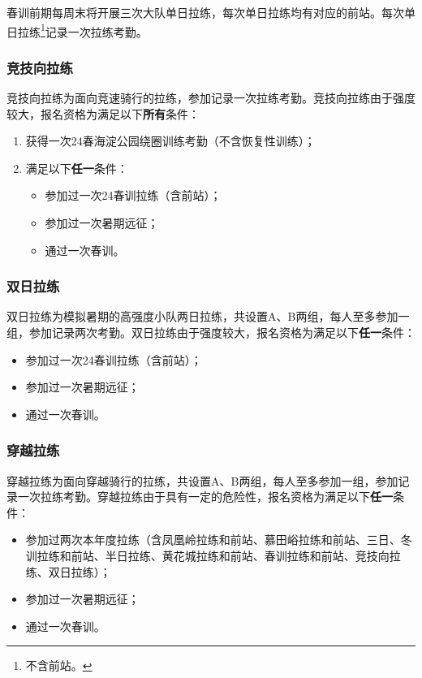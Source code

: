 \documentclass[UTF8]{ctexart}
\begin{document}
春训前期每周末将开展三次大队单日拉练，每次单日拉练均有对应的前站。每次单日拉练\footnote{不含前站。}记录一次拉练考勤。

\subsubsection{竞技向拉练}

竞技向拉练为面向竞速骑行的拉练，参加记录一次拉练考勤。竞技向拉练由于强度较大，报名资格为满足以下\textbf{所有}条件：
\begin{enumerate}[nosep,left=4em]
    \item 获得一次24春海淀公园绕圈训练考勤（不含恢复性训练）；
    \item 满足以下\textbf{任一}条件：
    \begin{itemize}[nosep,left=1em]
        \item 参加过一次24春训拉练（含前站）；
        \item 参加过一次暑期远征；
        \item 通过一次春训。
    \end{itemize}
\end{enumerate}

\subsubsection{双日拉练}

双日拉练为模拟暑期的高强度小队两日拉练，共设置A、B两组，每人至多参加一组，参加记录两次考勤。双日拉练由于强度较大，报名资格为满足以下\textbf{任一}条件：
\begin{itemize}[nosep,left=4em]
    \item 参加过一次24春训拉练（含前站）；
    \item 参加过一次暑期远征；
    \item 通过一次春训。
\end{itemize}

\subsubsection{穿越拉练}

穿越拉练为面向穿越骑行的拉练，共设置A、B两组，每人至多参加一组，参加记录一次拉练考勤。穿越拉练由于具有一定的危险性，报名资格为满足以下\textbf{任一}条件：
\begin{itemize}[nosep,left=4em]
    \item 参加过两次本年度拉练（含凤凰岭拉练和前站、慕田峪拉练和前站、三日、冬训拉练和前站、半日拉练、黄花城拉练和前站、春训拉练和前站、竞技向拉练、双日拉练）；
    \item 参加过一次暑期远征；
    \item 通过一次春训。
\end{itemize}
\end{document}
